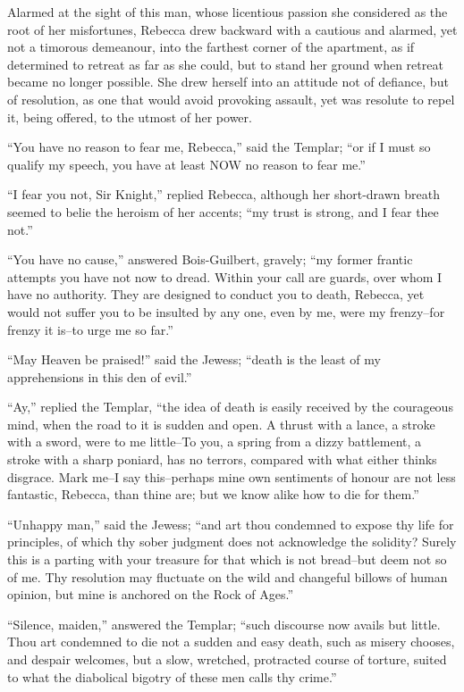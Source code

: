 Alarmed at the sight of this man, whose licentious passion she
considered as the root of her misfortunes, Rebecca drew backward with a
cautious and alarmed, yet not a timorous demeanour, into the farthest
corner of the apartment, as if determined to retreat as far as she
could, but to stand her ground when retreat became no longer possible.
She drew herself into an attitude not of defiance, but of resolution, as
one that would avoid provoking assault, yet was resolute to repel it,
being offered, to the utmost of her power.

``You have no reason to fear me, Rebecca,'' said the Templar; ``or if I
must so qualify my speech, you have at least NOW no reason to fear me.''

``I fear you not, Sir Knight,'' replied Rebecca, although her
short-drawn breath seemed to belie the heroism of her accents; ``my
trust is strong, and I fear thee not.''

``You have no cause,'' answered Bois-Guilbert, gravely; ``my former
frantic attempts you have not now to dread. Within your call are guards,
over whom I have no authority. They are designed to conduct you to
death, Rebecca, yet would not suffer you to be insulted by any one, even
by me, were my frenzy--for frenzy it is--to urge me so far.''

``May Heaven be praised!'' said the Jewess; ``death is the least of my
apprehensions in this den of evil.''

``Ay,'' replied the Templar, ``the idea of death is easily received by
the courageous mind, when the road to it is sudden and open. A thrust
with a lance, a stroke with a sword, were to me little--To you, a spring
from a dizzy battlement, a stroke with a sharp poniard, has no terrors,
compared with what either thinks disgrace. Mark me--I say this--perhaps
mine own sentiments of honour are not less fantastic, Rebecca, than
thine are; but we know alike how to die for them.''

``Unhappy man,'' said the Jewess; ``and art thou condemned to expose thy
life for principles, of which thy sober judgment does not acknowledge
the solidity? Surely this is a parting with your treasure for that which
is not bread--but deem not so of me. Thy resolution may fluctuate on the
wild and changeful billows of human opinion, but mine is anchored on the
Rock of Ages.''

``Silence, maiden,'' answered the Templar; ``such discourse now avails
but little. Thou art condemned to die not a sudden and easy death, such
as misery chooses, and despair welcomes, but a slow, wretched,
protracted course of torture, suited to what the diabolical bigotry of
these men calls thy crime.''

